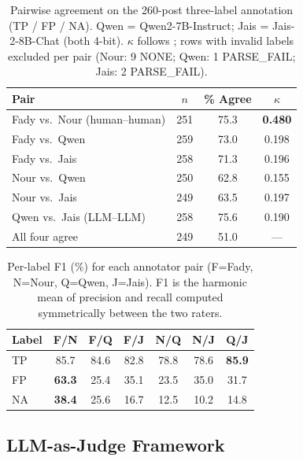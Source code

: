 \documentclass[11pt]{article}
\begin{document}
\begin{table}[h]
\centering
\small
\begin{tabular}{lccc}
\toprule
\textbf{Pair} & $n$ & \textbf{\% Agree} & $\kappa$ \\
\midrule
Fady vs.\ Nour (human--human) & 251 & 75.3 & \textbf{0.480} \\
\midrule
Fady vs.\ Qwen                & 259 & 73.0 & 0.198 \\
Fady vs.\ Jais                & 258 & 71.3 & 0.196 \\
Nour vs.\ Qwen                & 250 & 62.8 & 0.155 \\
Nour vs.\ Jais                & 249 & 63.5 & 0.197 \\
\midrule
Qwen vs.\ Jais (LLM--LLM)     & 258 & 75.6 & 0.190 \\
\midrule
All four agree                 & 249 & 51.0 & ---   \\
\bottomrule
\end{tabular}
\caption{Pairwise agreement on the 260-post three-label annotation
(TP / FP / NA). Qwen = Qwen2-7B-Instruct; Jais = Jais-2-8B-Chat
(both 4-bit). $\kappa$ follows \citet{landis1977measurement};
rows with invalid labels excluded per pair (Nour: 9 NONE;
Qwen: 1 PARSE\_FAIL; Jais: 2 PARSE\_FAIL).}
\label{tab:iaa_manual}
\end{table}

\begin{table}[h]
\centering
\small
\begin{tabular}{lcccccc}
\toprule
\textbf{Label}
  & \textbf{F/N} & \textbf{F/Q} & \textbf{F/J}
  & \textbf{N/Q} & \textbf{N/J} & \textbf{Q/J} \\
\midrule
TP & 85.7 & 84.6 & 82.8 & 78.8 & 78.6 & \textbf{85.9} \\
FP & \textbf{63.3} & 25.4 & 35.1 & 23.5 & 35.0 & 31.7 \\
NA & \textbf{38.4} &  25.6 & 16.7 & 12.5 & 10.2 & 14.8 \\
\bottomrule
\end{tabular}
\caption{Per-label F1 (\%) for each annotator pair (F=Fady, N=Nour,
Q=Qwen, J=Jais). F1 is the harmonic mean of precision and recall
computed symmetrically between the two raters.}
\label{tab:iaa_manual_perlabel}
\end{table}

\subsection{LLM-as-Judge Framework}
\label{subsec:llm_judge}
\end{document}

